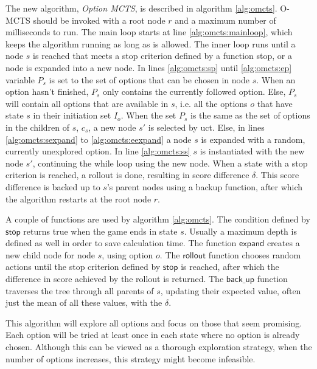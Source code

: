 The new algorithm, \emph{Option MCTS}, is described in algorithm
\ref{alg:omcts}. O-MCTS should be invoked with a root node $r$ and a maximum
number of milliseconds to run. The main loop starts at line
\ref{alg:omcts:mainloop}, which keeps the algorithm running as long as is
allowed. The inner loop runs until a node $s$ is reached that meets a stop
criterion defined by a function \textsf{stop}, or a node is expanded into a new
node. In lines \ref{alg:omcts:sp} until \ref{alg:omcts:ep} variable $P_s$ is set
to the set of options that can be chosen in node $s$. When an option hasn't
finished, $P_s$ only contains the currently followed option. Else, $P_s$ will
contain all options that are available in $s$, i.e. all the options $o$ that
have state $s$ in their initiation set $I_o$. 
When the set $P_s$ is the same as
the set of options in the children of $s$, $c_s$, a new node $s'$ is selected by
\textsf{uct}. Else, in lines \ref{alg:omcts:sexpand} to \ref{alg:omcts:eexpand}
a node $s$ is expanded with a random, currently unexplored option. In line
\ref{alg:omcts:ss} $s$ is instantiated with the new node $s'$, continuing the
while loop using the new node. When a state with a stop criterion is reached, a
rollout is done, resulting in score difference $\delta$. This score difference
is backed up to $s$'s parent nodes using a backup function, after which the
algorithm restarts at the root node $r$.

A couple of functions are used by algorithm \ref{alg:omcts}. The condition defined by
$\mathsf{stop}$ returns true when the game ends in state $s$. Usually
a maximum depth is defined as well in order to save calculation time. The
function $\mathsf{expand}$ creates a new child node for node $s$, using option
$o$. The $\mathsf{rollout}$ function chooses random actions until the stop
criterion defined by $\mathsf{stop}$ is reached, after which the difference in
score achieved by the rollout is returned. The $\mathsf{back\_up}$ function
traverses the tree through all parents of $s$, updating their expected value,
 often just the mean of all these values,  with the $\delta$. 

This algorithm will explore all options and focus on those that seem promising.
Each option will be tried at least once in each state where no option is already
chosen. Although this can be viewed as a thorough exploration strategy, when the
number of options increases, this strategy might become infeasible.

